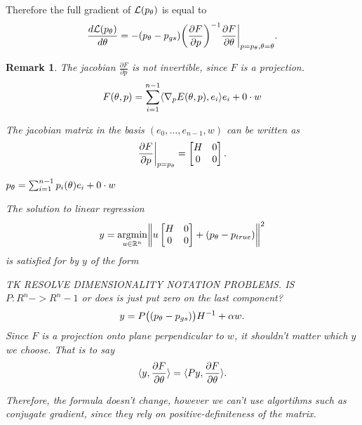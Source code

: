 \documentclass[a4paper,10pt]{report}
\newtheorem{remark}{Remark}
\begin{document}
Therefore the full gradient of $\mathcal{L}(p_\theta)$ is equal to
\begin{equation}
 \frac{d\mathcal{L}(p_\theta)}{d \theta} = - (p_\theta - p_{gs})\bigg(\frac{\partial F}{\partial p}\bigg)^{-1}  \frac{\partial F}{\partial \theta}\bigg|_{p=p_\theta, \theta=\theta}.
\end{equation}
\begin{remark}
 The jacobian $\frac{\partial F}{\partial p}$ is not invertible, since $F$ is a projection.
 \begin{equation}
  F(\theta, p) = \sum_{i=1}^{n-1} \langle \nabla_p E(\theta, p), e_i \rangle e_i +  0 \cdot w
 \end{equation}

 The jacobian matrix in the basis $(e_0,...,e_{n-1},w)$ can be written as \begin{equation}
                      \frac{\partial F}{\partial p}\bigg|_{p=p_\theta} =\begin{bmatrix}
H & 0 \\
0 & 0
\end{bmatrix}.
                     \end{equation}



 $p_\theta = \sum_{i=1}^{n-1}p_i(\theta) e_i +  0 \cdot w$



The solution to linear regression
\begin{equation}
 y = \underset{u\in \mathbb{R}^n}{\mathrm{argmin }}\bigg\|u \begin{bmatrix}
H & 0 \\
0 & 0
\end{bmatrix} + (p_\theta-p_{true})\bigg\|^2
\end{equation}
is satisfied for by $y$ of the form

TK RESOLVE DIMENSIONALITY NOTATION PROBLEMS. IS $P:R^n ->R^n-1$ or does is just put zero on the last component?
\begin{equation}
 y = P\big((p_\theta-p_{gs})\big)H^{-1} + \alpha w.
\end{equation}
Since $F$ is a projection onto plane perpendicular to $w$, it shouldn't matter which $y$ we choose.
That is to say
\begin{equation}
 \langle y,  \frac{\partial F}{\partial \theta} \rangle=\langle Py, \frac{\partial F}{\partial \theta} \rangle.
\end{equation}

Therefore, the formula doesn't change, however we can't use algortihms such as conjugate gradient, since they rely on positive-definiteness of the matrix.
\end{remark}
\end{document}

